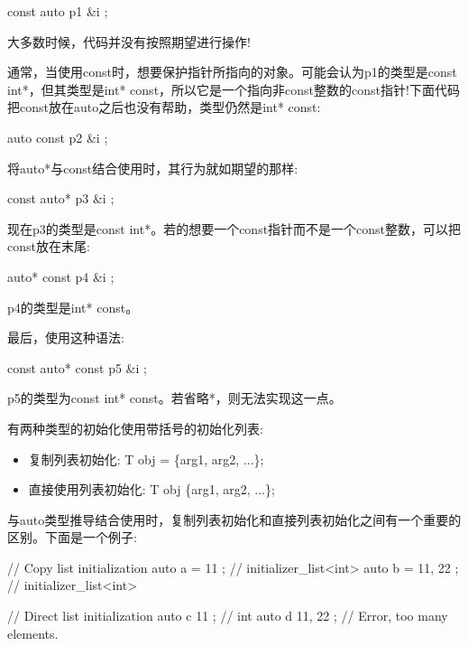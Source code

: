 \begin{cpp}
const auto p1 { &i };
\end{cpp}

大多数时候，代码并没有按照期望进行操作!

通常，当使用const时，想要保护指针所指向的对象。可能会认为p1的类型是const int*，但其类型是int* const，所以它是一个指向非const整数的const指针!下面代码把const放在auto之后也没有帮助，类型仍然是int* const:

\begin{cpp}
auto const p2 { &i };
\end{cpp}

将auto*与const结合使用时，其行为就如期望的那样:

\begin{cpp}
const auto* p3 { &i };
\end{cpp}

现在p3的类型是const int*。若的想要一个const指针而不是一个const整数，可以把const放在末尾:

\begin{cpp}
auto* const p4 { &i };
\end{cpp}

p4的类型是int* const。

最后，使用这种语法:

\begin{cpp}
const auto* const p5 { &i };
\end{cpp}

p5的类型为const int* const。若省略*，则无法实现这一点。


有两种类型的初始化使用带括号的初始化列表:

\begin{itemize}
\item
复制列表初始化: T obj = \{arg1, arg2, ...\};

\item
直接使用列表初始化: T obj \{arg1, arg2, ...\};
\end{itemize}

与auto类型推导结合使用时，复制列表初始化和直接列表初始化之间有一个重要的区别。下面是一个例子:

\begin{cpp}
// Copy list initialization
auto a = { 11 }; // initializer_list<int>
auto b = { 11, 22 }; // initializer_list<int>

// Direct list initialization
auto c { 11 }; // int
auto d { 11, 22 }; // Error, too many elements.
\end{cpp}

